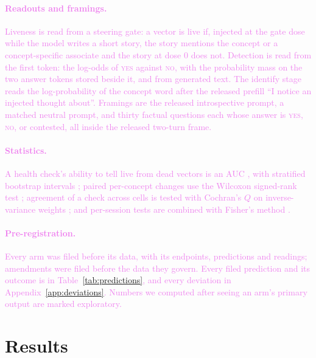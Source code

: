 \documentclass[11pt,a4paper]{article}
\newcommand{\yes}{\textup{\textsc{yes}}}
\newcommand{\no}{\textup{\textsc{no}}}
\newcommand{\draft}[1]{\textcolor{violet}{#1}}
\begin{document}
\draft{\paragraph{Readouts and framings.} Liveness is read from a steering gate: a vector is live
if, injected at the gate dose while the model writes a short story, the story mentions the concept
or a concept-specific associate and the story at dose 0 does not. Detection is read from the first
token: the log-odds of \yes{} against \no{}, with the probability mass on the two answer tokens
stored beside it, and from generated text. The identify stage reads the log-probability of the
concept word after the released prefill ``I notice an injected thought about''. Framings are the
released introspective prompt, a matched neutral prompt, and thirty factual questions each whose
answer is \yes{}, \no{}, or contested, all inside the released two-turn frame.}

\draft{\paragraph{Statistics.} A health check's ability to tell live from dead vectors is an AUC
\citep{hanley1982meaning}, with stratified bootstrap intervals \citep{efron1979bootstrap}; paired
per-concept changes use the Wilcoxon signed-rank test \citep{wilcoxon1945individual}; agreement of a
check across cells is tested with Cochran's $Q$ on inverse-variance weights
\citep{cochran1954combination,hanley1982meaning}; and per-session tests are combined with Fisher's method
\citep{fisher1925statistical}.}

\draft{\paragraph{Pre-registration.} Every arm was filed before its data, with its endpoints,
predictions and readings; amendments were filed before the data they govern. Every filed
prediction and its outcome is in Table~\ref{tab:predictions}, and every deviation in
Appendix~\ref{app:deviations}. Numbers we computed after seeing an arm's primary output are marked
exploratory.}

\section{Results}
\label{sec:results}
\end{document}
